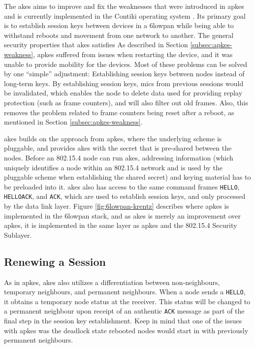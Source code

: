 The \gls{akes} aims to improve and fix the weaknesses that were introduced in \gls{apkes} and is currently implemented in the Contiki operating system \cite{krentz2015handling}. Its primary goal is to establish session keys between devices in a \gls{6lowpan} while being able to withstand reboots and movement from one network to another. The general security properties that \gls{akes} satisfies As described in Section \ref{subsec:apkes-weakness}, \gls{apkes} suffered from issues when restarting the device, and it was unable to provide mobility for the devices. Most of these problems can be solved by one ``simple'' adjustment: Establishing session keys between nodes instead of long-term keys. By establishing session keys, \gls{mic}s from previous sessions would be invalidated, which enables the node to delete data used for providing replay protection (such as frame counters), and will also filter out old frames. Also, this removes the problem related to frame counters being reset after a reboot, as mentioned in Section \ref{subsec:apkes-weakness}. 

\gls{akes} builds on the approach from \gls{apkes}, where the underlying scheme is pluggable, and provides \gls{akes} with the secret that is pre-shared between the nodes. Before an 802.15.4 node can run \gls{akes}, addressing information (which uniquely identifies a node within an 802.15.4 network and is used by the pluggable scheme when establishing the shared secret) and keying material has to be preloaded into it. \gls{akes} also has access to the same command frames \texttt{HELLO}, \texttt{HELLOACK}, and \texttt{ACK}, which are used to establish session keys, and only processed by the data link layer. Figure \ref{fig:6lowpan-krentz} describes where \gls{apkes} is implemented in the \gls{6lowpan} stack, and as \gls{akes} is merely an improvement over \gls{apkes}, it is implemented in the same layer as \gls{apkes} and the 802.15.4 Security Sublayer. 

\subsection{Renewing a Session}

As in \gls{apkes}, \gls{akes} also utilizes a differentiation between non-neighbours, temporary neighbours, and permanent neighbours. When a node sends a \texttt{HELLO}, it obtains a temporary node status at the receiver. This status will be changed to a permanent neighbour upon receipt of an authentic \texttt{ACK} message as part of the final step in the session key establishment. Keep in mind that one of the issues with \gls{apkes} was the deadlock state rebooted nodes would start in with previously permanent neighbours.

